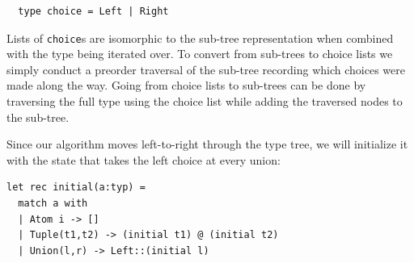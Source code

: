 \documentclass[a4paper,english]{lipics-v2019}
\begin{document}
\begin{lstlisting}
  type choice = Left | Right
\end{lstlisting}


Lists of \verb|choice|s are isomorphic to the sub-tree representation when
combined with the type being iterated over. To convert from sub-trees  to
choice lists we simply conduct a preorder traversal of the sub-tree recording
which choices were made along the way. Going from choice lists to sub-trees can
be done by traversing the full type using the choice list while adding the traversed
nodes to the sub-tree.

Since our algorithm moves left-to-right through the type tree, we will
initialize it with the state that takes the left choice at every union:


\begin{lstlisting}
let rec initial(a:typ) = 
  match a with
  | Atom i -> []
  | Tuple(t1,t2) -> (initial t1) @ (initial t2)
  | Union(l,r) -> Left::(initial l)
\end{lstlisting}
\end{document}
